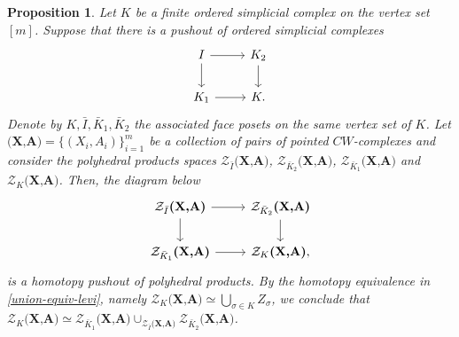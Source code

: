 \documentclass[a4paper,11pt]{article}
\newtheorem{proposition}[theorem]{Proposition}
\theoremstyle{definition}
\newcommand{\ZZ}{\mathcal{Z}}
\begin{document}
\begin{proposition}\label{induce-pushout}
	Let $K$ be a finite ordered simplicial complex on the vertex set $[m]$. Suppose that there is a pushout of ordered simplicial complexes 
	\[
	\begin{tikzcd}
		I \arrow[r] \arrow[d] & K_2 \arrow[d] \\
		K_1 \arrow[r]  & K. 
	\end{tikzcd}
	\]
	Denote by $K, \bar I, \bar K_1, \bar K_2$ the associated face posets on the same vertex set of $K$. Let $\textbf{(X,A)} = \{(X_i,A_i)\}_{i=1}^m$ be a collection of pairs of pointed $CW$-complexes and consider the polyhedral products spaces $\ZZ_{\bar I}\textbf{(X,A)}$, $\ZZ_{\bar K_2}\textbf{(X,A)}$, $\ZZ_{\bar K_1}\textbf{(X,A)}$ and $\ZZ_{K}\textbf{(X,A)}$. Then, the diagram below
	\[
	\begin{tikzcd}
		\ZZ_{\bar I}\textbf{(X,A)} \arrow[r] \arrow[d] & \ZZ_{\bar K_2}\textbf{(X,A)} \arrow[d] \\
		\ZZ_{\bar K_1}\textbf{(X,A)} \arrow[r]  & \ZZ_{K}\textbf{(X,A)},
	\end{tikzcd}
	\] 
	is a homotopy pushout of polyhedral products. By the homotopy equivalence in \ref{union-equiv-levi}, namely $\ZZ_{K}\textbf{(X,A)} \simeq \bigcup_{\sigma \in K} Z_\sigma$, we conclude that $\ZZ_{K}\textbf{(X,A)} \simeq \ZZ_{{\bar K_1}}\textbf{(X,A)}\cup_{\ZZ_{\bar I}\textbf{(X,A)}} \ZZ_{\bar K_2}\textbf{(X,A)}$.  
\end{proposition}
\end{document}
